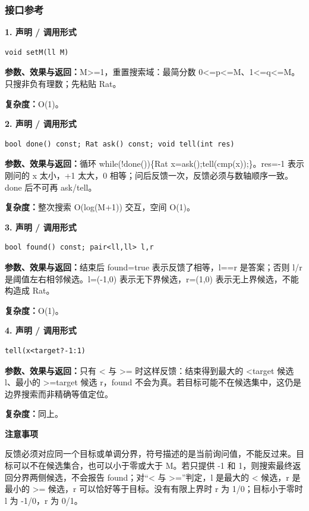 \documentclass[UTF8,a4paper,10pt]{ctexart}
\newcommand{\TemplNote}[1]{\textbf{注意事项}\par #1\par}
\begin{document}
\subsubsection*{接口参考}
\noindent\begin{minipage}{\textwidth}
\textbf{1. 声明 / 调用形式}
\begin{lstlisting}
void setM(ll M)
\end{lstlisting}
\textbf{参数、效果与返回：}M>=1，重置搜索域：最简分数 0<=p<=M、1<=q<=M。只搜非负有理数；先粘贴 Rat。

\textbf{复杂度：}O(1)。

\end{minipage}\par\vspace{0.4em}
\noindent\begin{minipage}{\textwidth}
\textbf{2. 声明 / 调用形式}
\begin{lstlisting}
bool done() const; Rat ask() const; void tell(int res)
\end{lstlisting}
\textbf{参数、效果与返回：}循环 while(!done())\{Rat x=ask();tell(cmp(x));\}。res=-1 表示刚问的 x 太小，+1 太大，0 相等；问后反馈一次，反馈必须与数轴顺序一致。done 后不可再 ask/tell。

\textbf{复杂度：}整次搜索 O(log(M+1)) 交互，空间 O(1)。

\end{minipage}\par\vspace{0.4em}
\noindent\begin{minipage}{\textwidth}
\textbf{3. 声明 / 调用形式}
\begin{lstlisting}
bool found() const; pair<ll,ll> l,r
\end{lstlisting}
\textbf{参数、效果与返回：}结束后 found=true 表示反馈了相等，l==r 是答案；否则 l/r 是阈值左右相邻候选。l=(-1,0) 表示无下界候选，r=(1,0) 表示无上界候选，不能构造成 Rat。

\textbf{复杂度：}O(1)。

\end{minipage}\par\vspace{0.4em}
\noindent\begin{minipage}{\textwidth}
\textbf{4. 声明 / 调用形式}
\begin{lstlisting}
tell(x<target?-1:1)
\end{lstlisting}
\textbf{参数、效果与返回：}只有 < 与 >= 时这样反馈：结束得到最大的 <target 候选 l、最小的 >=target 候选 r，found 不会为真。若目标可能不在候选集中，这仍是边界搜索而非精确等值定位。

\textbf{复杂度：}同上。

\TemplNote{反馈必须对应同一个目标或单调分界，符号描述的是当前询问值，不能反过来。目标可以不在候选集合，也可以小于零或大于 M。若只提供 -1 和 1，则搜索最终返回分界两侧候选，不会报告 found；对“< 与 >=”判定，l 是最大的 < 候选，r 是最小的 >= 候选，r 可以恰好等于目标。没有有限上界时 r 为 1/0；目标小于零时 l 为 -1/0，r 为 0/1。}
\end{minipage}\par\vspace{0.4em}
\clearpage
\end{document}
